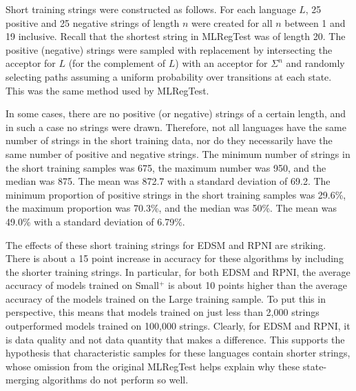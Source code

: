 \documentclass[twoside,11pt]{article}
\begin{document}
Short training strings were constructed as follows.  For each language $L$, 25 positive and 25 negative strings of length $n$ were created for all $n$ between 1 and 19 inclusive. 
Recall that the shortest string in MLRegTest was of length 20.
The positive (negative) strings were sampled with replacement by intersecting the acceptor for $L$ (for the complement of $L$) with an acceptor for $\Sigma^n$ and randomly selecting paths assuming a uniform probability over transitions at each state. 
This was the same method used by MLRegTest.

In some cases, there are no positive (or negative) strings of a certain length, and in such a case no strings were drawn.
Therefore, not all languages have the same number of strings in the short training data, nor do they necessarily have the same number of positive and negative strings. The minimum number of strings in the short training samples was 675, the maximum number was 950, and the median was 875. The mean was 872.7 with a standard deviation of 69.2. The minimum proportion of positive strings in the short training samples was 29.6\%, the maximum proportion was 70.3\%, and the median was 50\%. The mean was 49.0\% with a standard deviation of 6.79\%.



The effects of these short training strings for EDSM and RPNI are striking. 
There is about a 15 point increase in accuracy for these algorithms by including the shorter training strings. 
In particular, for both EDSM and RPNI, the average accuracy of models trained on  Small$^+$ is about 10 points higher than the average accuracy of the models trained on the Large training sample.
To put this in perspective, this means that models trained on just less than 2,000 strings outperformed models trained on 100,000 strings. 
Clearly, for EDSM and RPNI, it is data quality and not data quantity that makes a difference.
This supports the hypothesis that characteristic samples for these languages contain shorter strings, whose omission from the original MLRegTest helps explain why these state-merging algorithms do not perform so well.
\end{document}
